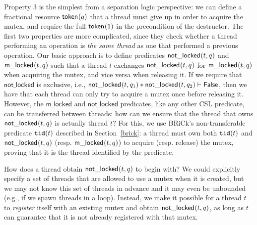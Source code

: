 Property 3 is the simplest from a separation logic perspective: we can define a fractional resource $\mathsf{token}_{}(q)$ that a thread must give up in order to acquire the mutex, and require the full $\mathsf{token}_{}(1)$ in the precondition of the destructor. The first two properties are more complicated, since they check whether a thread performing an operation is \emph{the same thread} as one that performed a previous operation. Our basic approach is to define predicates $\mathsf{not\_locked}_{}(t, q)$ and $\mathsf{m\_locked}_{}(t, q)$ such that a thread $t$ exchanges $\mathsf{not\_locked}_{}(t, q)$ for $\mathsf{m\_locked}_{}(t, q)$ when acquiring the mutex, and vice versa when releasing it. If we require that $\mathsf{not\_locked}$ is exclusive, i.e., $\mathsf{not\_locked}_{}(t, q_1) \ast \mathsf{not\_locked}_{}(t, q_2) \vdash \mathsf{False}$, then we have that each thread can only try to acquire a mutex once before releasing it.
However, the $\mathsf{m\_locked}$ and $\mathsf{not\_locked}$ predicates, like any other CSL predicate, can be transferred between threads: how can we ensure that the thread that owns $\mathsf{not\_locked}_{}(t, q)$ is actually thread $t$? For this, we use BRiCk's non-transferable predicate $\mathtt{tid}(t)$ described in Section~\ref{brick}: a thread must own both $\mathtt{tid}(t)$ and $\mathsf{not\_locked}_{}(t, q)$ (resp. $\mathsf{m\_locked}_{}(t, q)$) to acquire (resp. release) the mutex, proving that it is the thread identified by the predicate. 

How does a thread obtain $\mathsf{not\_locked}_{}(t, q)$ to begin with? We could explicitly specify a set of threads that are allowed to use a mutex when it is created, but we may not know this set of threads in advance and it may even be unbounded (e.g., if we spawn threads in a loop). Instead, we make it possible for a thread $t$ to \emph{register} itself with an existing mutex and obtain $\mathsf{not\_locked}_{}(t, q)$, as long as $t$ can guarantee that it is not already registered with that mutex.

